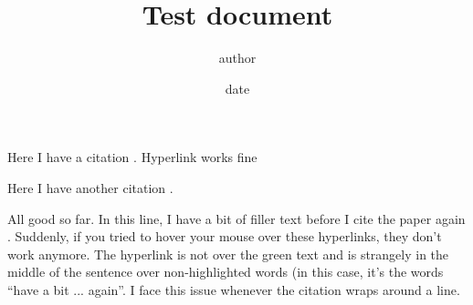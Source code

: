 \documentclass[11pt]{article}
\title{Test document}
\author{author}
\date{date}
\begin{document}
\maketitle

Here I have a citation \cite{book}. Hyperlink works fine

Here I have another citation \cite*{paper}.

All good so far. In this line, I have a bit of filler text before I cite the paper again \cite*{paper}. Suddenly, if you tried to hover your mouse over these hyperlinks, they don't work anymore. The hyperlink is not over the green text and is strangely in the middle of the sentence over non-highlighted words (in this case, it's the words ``have a bit ... again''. I face this issue whenever the citation wraps around a line.




\renewcommand \refname{Bibliography and References}
\begin{flushleft}
	
\end{flushleft}

\nocite{*}
\end{document}
